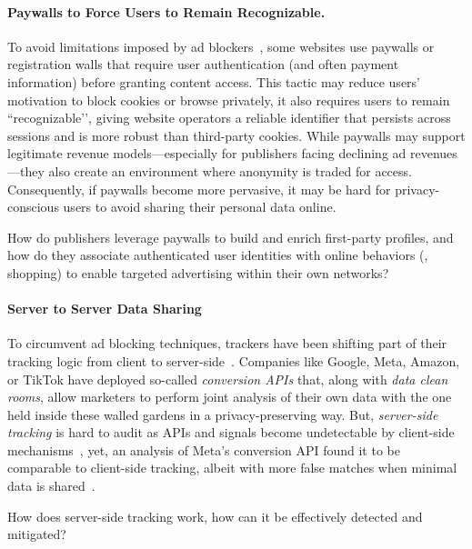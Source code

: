 \paragraph{Paywalls to Force Users to Remain Recognizable.}
To avoid limitations imposed by ad blockers~\cite{koreacopyrightcommissionNumberAdblockUsers2024}, some websites use paywalls or registration walls that require user authentication (and often payment information) before granting content access.
%
This tactic may reduce users' motivation to block cookies or browse privately, it also requires users to remain ``recognizable’’, giving website operators a reliable identifier that persists across sessions and is more robust than third-party cookies.
%
While paywalls may support legitimate revenue models---especially for publishers facing declining ad revenues---they also create an environment where anonymity is traded for access.
%
Consequently, if paywalls become more pervasive, it may be hard for privacy-conscious users to avoid sharing their personal data online.

\begin{opbox}
How do publishers leverage paywalls to build and enrich first-party profiles, and how do they associate authenticated user identities with online behaviors (\eg{}, shopping) to enable targeted advertising within their own networks?
\end{opbox}
\vspace{-3mm}


\paragraph{Server to Server Data Sharing}
%
To circumvent ad blocking techniques, trackers have been shifting part of their tracking logic from client to server-side~\cite{fisherImprovePerformanceSecurity2020}.
%
Companies like Google, Meta, Amazon, or TikTok have deployed so-called \textit{conversion APIs} that, along with \textit{data clean rooms}, allow marketers to perform joint analysis of their own data with the one held inside these walled gardens in a privacy-preserving way.
%
But, \textit{server-side tracking} is hard to audit as APIs and signals become undetectable by client-side mechanisms~\cite{fouadDevilDetailsDetection2024}, yet, an analysis of Meta's conversion API found it to be comparable to client-side tracking, albeit with more false matches when minimal data is shared~\cite{fraihiClientsideServersideTracking2024}.
\begin{opbox}
How does server-side tracking work, how can it be effectively detected and mitigated?
\end{opbox}
\vspace{-3mm}


